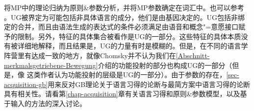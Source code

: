 \citet[]{Chomsky2008a}将MP中的理论归纳为原则\&参数分析，并将MP参数确定在词汇中。也可以参考 。UG被界定为可能包括非具体语言的成分，他们是由基因决定的\citep[]{Chomsky2007a}。UG包括非绑定的合并，而且由语法生成的表达式的条件必须满足由语音和概念"=意愿接口赋予的限制。另外，特征的具体集合被看作是UG的一部分\citep[--7]{Chomsky2007a}。这些特征的具体本质没有被详细地解释，而且结果是，UG的力量有时是模糊的。但是，在不同的语言学阵营里有达成一致的地方，就像Chomsky并不认为我们在\ref{Abschnitt-merkmalsgetriebene-Bewegung}介绍的功能投射的部分也构成UG的一部分（但是，像 \citet{CR2010a}这类作者认为功能投射的层级是UG的一部分）。由于参数的存在，\ref{sec-acquisition-gb}用来反对GB理论关于语言习得的论断与最简方案中语言习得的论断具有相关性。请看第\ref{chap-acquisition}章有关语言习得和原则\&参数模型，以及基于输入的方法的深入讨论。

